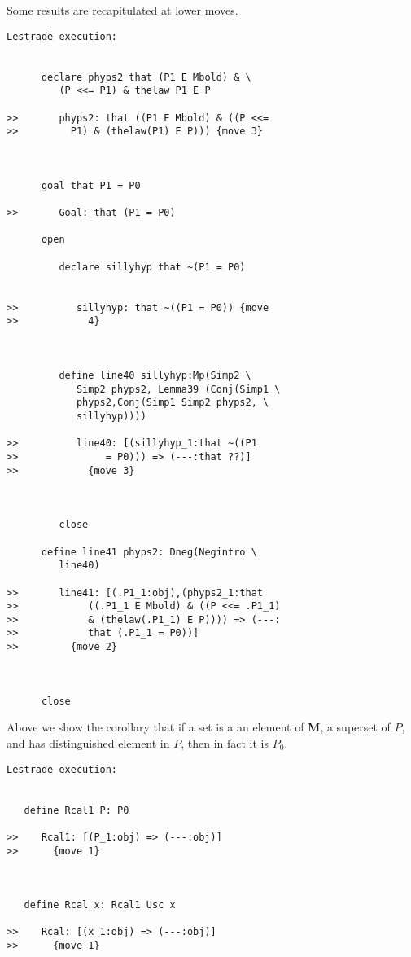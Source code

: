 \documentclass[12pt]{article}
\begin{document}
Some results are recapitulated at lower moves.

\begin{verbatim}Lestrade execution:


      declare phyps2 that (P1 E Mbold) & \
         (P <<= P1) & thelaw P1 E P

>>       phyps2: that ((P1 E Mbold) & ((P <<=
>>         P1) & (thelaw(P1) E P))) {move 3}



      goal that P1 = P0

>>       Goal: that (P1 = P0)

      open

         declare sillyhyp that ~(P1 = P0)


>>          sillyhyp: that ~((P1 = P0)) {move
>>            4}



         define line40 sillyhyp:Mp(Simp2 \
            Simp2 phyps2, Lemma39 (Conj(Simp1 \
            phyps2,Conj(Simp1 Simp2 phyps2, \
            sillyhyp))))

>>          line40: [(sillyhyp_1:that ~((P1
>>               = P0))) => (---:that ??)]
>>            {move 3}



         close

      define line41 phyps2: Dneg(Negintro \
         line40)

>>       line41: [(.P1_1:obj),(phyps2_1:that
>>            ((.P1_1 E Mbold) & ((P <<= .P1_1)
>>            & (thelaw(.P1_1) E P)))) => (---:
>>            that (.P1_1 = P0))]
>>         {move 2}



      close
\end{verbatim}

Above we show the corollary that if a set is a an element of {\bf M}, a superset of $P$, and has distinguished element in $P$, then in fact it is $P_0$.

\begin{verbatim}Lestrade execution:


   define Rcal1 P: P0

>>    Rcal1: [(P_1:obj) => (---:obj)]
>>      {move 1}



   define Rcal x: Rcal1 Usc x

>>    Rcal: [(x_1:obj) => (---:obj)]
>>      {move 1}


\end{verbatim}
\end{document}
